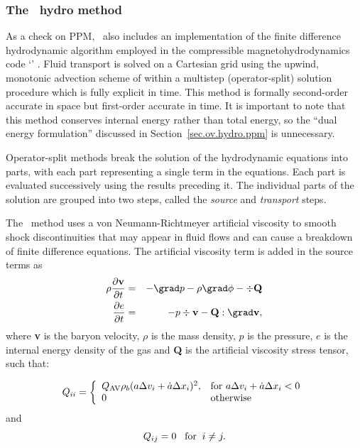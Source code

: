 \subsubsection{The \zeus\ hydro method}\label{sec.ov.hydro.zeus}


As a check on PPM, \enzo\ also includes an implementation of the
finite difference hydrodynamic algorithm employed in the compressible 
magnetohydrodynamics code `\zeus'
\citep{Stone92a, Stone92b}.  Fluid transport is solved on a Cartesian
grid using the upwind, monotonic advection scheme of \citet{1977JCoPh..23..276V} 
within a multistep 
(operator-split) solution procedure which is fully explicit in time.  
This method is formally second-order accurate in space but 
first-order accurate in time.  It is important to note that 
this method conserves internal energy
rather than total energy, so the ``dual energy
formulation'' discussed in Section~\ref{sec.ov.hydro.ppm} is unnecessary.
 

Operator-split methods break
the solution of the hydrodynamic equations into parts, with each part
representing a single term in the equations.  Each part is evaluated
successively using the results preceding it.  The individual parts of
the solution are grouped into two steps, called the \emph{source} and
\emph{transport} steps.

The \zeus\ method uses a von Neumann-Richtmeyer artificial viscosity 
to smooth shock discontinuities that may
appear in fluid flows and can cause a breakdown of finite difference
equations.  The artificial viscosity term is added in the source terms
as
\begin{eqnarray}
\rho \frac{\partial\textbf{v}}{\partial t} &=& - \grad p - \rho \grad \phi 
- \div \textbf{Q} \\
\frac{\partial e}{\partial t} &=& -p \div \textbf{v} - \textbf{Q} : \grad \textbf{v}, 
\end{eqnarray}
where \textbf{v} is the baryon velocity, $\rho$ is the mass density,
$p$ is the pressure, $e$ is the internal energy density of the gas and \textbf{Q}
is the artificial viscosity stress tensor, such that:

\begin{eqnarray}
Q_{ii} = \left\{ \begin{array}{ll}
Q_{\rm AV} \rho_b  (a \Delta v_{i} + \dot{a} \Delta x_i)^2, 
& \textrm{for $a \Delta v_{i} + \dot{a} \Delta x_i < 0$}  \\
0 & \textrm{otherwise}\\
\end{array} \right. 
\end{eqnarray}
and
\begin{equation}
Q_{ij} = 0  \;\;\;{\rm for}\;\; i \ne j .
\end{equation}

